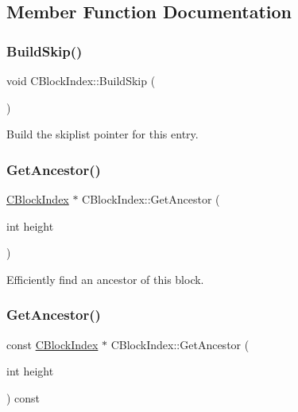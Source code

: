 \subsection{Member Function Documentation}
\mbox{\label{class_c_block_index_a21209a71e50daf10e283bd4049e46f64}} 
\subsubsection{\texorpdfstring{Build\+Skip()}{BuildSkip()}}
{\footnotesize\ttfamily void C\+Block\+Index\+::\+Build\+Skip (\begin{DoxyParamCaption}{ }\end{DoxyParamCaption})}



Build the skiplist pointer for this entry. 

\mbox{\label{class_c_block_index_ae1f702384690c6b8302e026a84172ef3}} 
\subsubsection{\texorpdfstring{Get\+Ancestor()}{GetAncestor()}\hspace{0.1cm}{\footnotesize\ttfamily [1/2]}}
{\footnotesize\ttfamily \mbox{\hyperlink{class_c_block_index}{C\+Block\+Index}} $\ast$ C\+Block\+Index\+::\+Get\+Ancestor (\begin{DoxyParamCaption}\item[{int}]{height }\end{DoxyParamCaption})}



Efficiently find an ancestor of this block. 

\mbox{\label{class_c_block_index_a7a58b33d64fde3df36c6e61371d031cc}} 
\subsubsection{\texorpdfstring{Get\+Ancestor()}{GetAncestor()}\hspace{0.1cm}{\footnotesize\ttfamily [2/2]}}
{\footnotesize\ttfamily const \mbox{\hyperlink{class_c_block_index}{C\+Block\+Index}} $\ast$ C\+Block\+Index\+::\+Get\+Ancestor (\begin{DoxyParamCaption}\item[{int}]{height }\end{DoxyParamCaption}) const}

